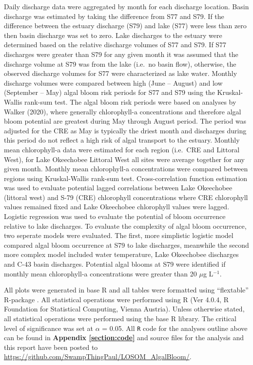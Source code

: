 \documentclass[]{interact}
\theoremstyle{plain}%
\theoremstyle{definition}
\theoremstyle{remark}
\begin{document}
Daily discharge data were aggregated by month for each discharge
location. Basin discharge was estimated by taking the difference from
S77 and S79. If the difference between the estuary discharge (S79) and
lake (S77) were less than zero then basin discharge was set to zero.
Lake discharges to the estuary were determined based on the relative
discharge volumes of S77 and S79. If S77 discharges were greater than
S79 for any given month it was assumed that the discharge volume at S79
was from the lake (i.e.~no basin flow), otherwise, the observed
discharge volumes for S77 were characterized as lake water. Monthly
discharge volumes were compared between high (June -- August) and low
(September -- May) algal bloom risk periods for S77 and S79 using the
Kruskal-Wallis rank-sum test. The algal bloom risk periods were based on
analyses by Walker (2020), where generally chlorophyll-a concentrations
and therefore algal bloom potential are greatest during May through
August period. The period was adjusted for the CRE as May is typically
the driest month and discharges during this period do not reflect a high
risk of algal transport to the estuary. Monthly mean chlorophyll-a data
were estimated for each region (i.e.~CRE and Littoral West), for Lake
Okeechobee Littoral West all sites were average together for any given
month. Monthly mean chlorophyll-a concentrations were compared between
regions using Kruskal-Wallis rank-sum test. Cross-correlation function
estimation was used to evaluate potential lagged correlations between
Lake Okeechobee (littoral west) and S-79 (CRE) chlorophyll
concentrations where CRE chlorophyll values remained fixed and Lake
Okeechobee chlorophyll values were lagged. Logistic regression was used
to evaluate the potential of bloom occurrence relative to lake
discharges. To evaluate the complexity of algal bloom occurrence, two
seperate models were evaluated. The first, more simplistic logistic
model compared algal bloom occurrence at S79 to lake discharges,
meanwhile the second more complex model included water temperature, Lake
Okeechobee discharges and C-43 basin discharges. Potential algal blooms
at S79 were identified if monthly mean chlorophyll-a concentrations were
greater than 20 \(\mu\)g L\(^{-1}\).

All plots were generated in base R and all tables were formatted using
``flextable'' R-package \citep{gohel_flextable_2021}. All statistical
operations were performed using R (Ver 4.0.4, R Foundation for
Statistical Computing, Vienna Austria). Unless otherwise stated, all
statistical operations were performed using the base R library. The
critical level of significance was set at \(\alpha\) = 0.05. All
\texttt{R} code for the analyses outline above can be found in
\textbf{Appendix \ref{section:code}} and source files for the analysis
and this report have been posted to
\url{https://github.com/SwampThingPaul/LOSOM_AlgalBloom/}.
\end{document}
